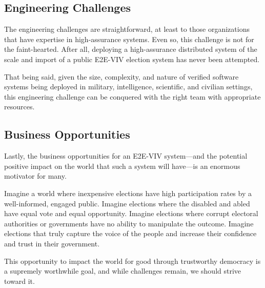 \subsection{Engineering Challenges}

The engineering challenges are straightforward, at least to those
organizations that have expertise in high-assurance systems. Even so,
this challenge is not for the faint-hearted. After all, deploying a
high-assurance distributed system of the scale and import of a public
E2E-VIV election system has never been attempted. 

That being said, given the size, complexity, and nature of verified
software systems being deployed in military, intelligence, scientific,
and civilian settings, this engineering challenge can be conquered
with the right team with appropriate resources.

\subsection{Business Opportunities}

Lastly, the business opportunities for an E2E-VIV system---and the
potential positive impact on the world that such a system will
have---is an enormous motivator for many. 

Imagine a world where inexpensive elections have high participation
rates by a well-informed, engaged public. Imagine elections where the
disabled and abled have equal vote and equal opportunity. Imagine
elections where corrupt electoral authorities or governments have no
ability to manipulate the outcome. Imagine elections that truly
capture the voice of the people and increase their confidence and
trust in their government. 

This opportunity to impact the world for good through trustworthy
democracy is a supremely worthwhile goal, and while challenges remain,
we should strive toward it.


